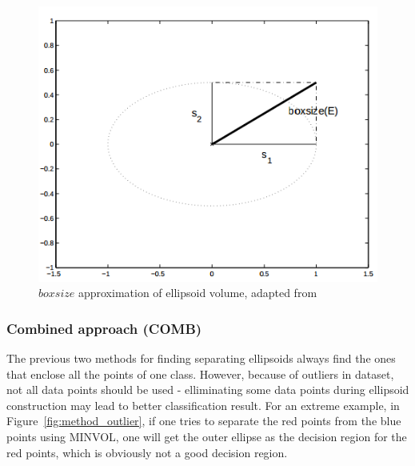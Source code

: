 \documentclass{scrartcl}
\begin{document}
\begin{figure}[H]
    \centering
    \includegraphics[scale=0.5]
    {method_figures/method_box.png}
    \caption{$boxsize$ approximation of ellipsoid volume, 
             adapted from \cite{glineur1998}}
    \label{fig:method_box}
\end{figure}

\subsubsection{Combined approach (COMB)}

\par
The previous two methods for finding separating ellipsoids always find
the ones that enclose all the points of one class.
However, because of outliers in dataset, not all data points should be
used - elliminating some data points during ellipsoid
construction may lead to better classification result.
For an extreme example, in Figure~\ref{fig:method_outlier}, if one tries
to separate the red points from the blue points using MINVOL, one will get the
outer ellipse as the decision region for the red points, which is obviously not
a good decision region.
\end{document}

